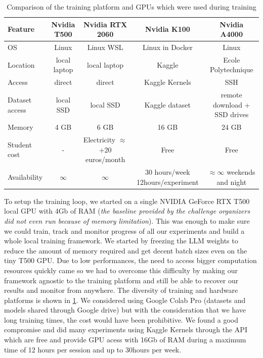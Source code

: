 \begin{table}[ht]
    \centering
    \begin{tabular}{lcccc}
    \hline
    \textbf{Feature} & \textbf{Nvidia T500} & \textbf{Nvidia RTX 2060} & \textbf{Nvidia K100} & \textbf{Nvidia A4000} \\ \hline
    OS & Linux & Linux WSL & Linux in Docker & Linux \\  
    Location            & local laptop           & local laptop  & Kaggle  & Ecole Polytechnique  \\
    Access & direct & direct & Kaggle Kernels & SSH \\
    Dataset access & local SSD & local SSD & Kaggle dataset & remote download + SSD drives\\ 
    Memory           & 4 GB                        & 6 GB                           & 16 GB                          & 24 GB                          \\
    Student cost & - & Electricity $\approx$ +20 euros/month & Free & Free \\
    Availability & $\infty$ & $\infty$ & 30 hours/week 12hours/experiment & $\approx \infty$ weekends and night \\
    \hline
    \end{tabular}
    \caption{Comparison of the training platform and GPUs which were used during training}
    \label{table:gpu_comparison}
\end{table}


To setup the training loop, we started on a single NVIDIA GeForce RTX T500 local GPU with 4Gb of RAM (\textit{the baseline provided by the challenge organizers did not even run because of memory limitation}). This was enough to make sure we could train, track and monitor progress of all our experiments and build a whole local training framework. We started by freezing the LLM weights to reduce the amount of memory required and get decent batch sizes even on the tiny T500 GPU. Due to low performances, the need to access bigger computation resources quickly came so we had to overcome this difficulty by making our framework agnostic to the training platform and still be able to recover our results and monitor from anywhere. The diversity of training and hardware platforms is shown in \ref*{table:gpu_comparison}. We considered using Google Colab Pro (datasets and models shared through Google drive) but with the consideration that we have long training times, the cost would have been prohibitive. We found a good compromise and did many experiments using Kaggle Kernels through the API which are free and provide GPU acess with 16Gb of RAM during a maximum time of 12 hours per session and up to 30hours per week.



